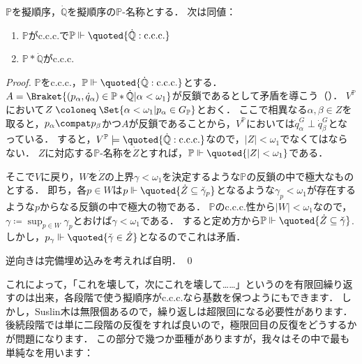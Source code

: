\documentclass[a4j]{ltjsarticle}
\renewcommand{\defeq}{\mathrel{\coloneq}}
\renewcommand{\emph}[1]{\textsf{\textgt{#1}}}
\begin{document}
\begin{lemma}
 $\mathbb{P}$を擬順序，$\dot{\mathbb{Q}}$を擬順序の$\mathbb{P}$-名称とする．
 次は同値：
 \begin{enumerate}
  \item $\mathbb{P}$がc.c.c.で$\mathbb{P} \Vdash \quoted{\dot{\mathbb{Q}}: \text{c.c.c.}}$
  \item $\mathbb{P} \ast \dot{\mathbb{Q}}$がc.c.c.
 \end{enumerate}
\end{lemma}
\begin{proof}
 $\mathbb{P}$をc.c.c.，$\mathbb{P} \Vdash \quoted{\dot{\mathbb{Q}}: \text{c.c.c.}}$とする．$A = \Braket{ (p_\alpha , \dot{q}_\alpha) \in \mathbb{P} \ast \dot{\mathbb{Q}} | \alpha < \omega_1}$が反鎖であるとして矛盾を導こう（\emph{背理法}）．
 $V^{\mathbb{P}}$において$Z \defeq \Set{\alpha < \omega_1 | p_\alpha \in G_{\mathbb{P}}}$とおく．
 ここで相異なる$\alpha, \beta \in Z$を取ると，$p_\alpha \compat p_\beta$かつ$A$が反鎖であることから，$V^{\mathbb{P}}$においては$\dot{q}_\alpha^G \perp \dot{q}_\beta^G$となっている．
 すると，$V^{\mathbb{P}} \models \quoted{\dot{\mathbb{Q}}: \text{c.c.c.}}$なので，$|Z| < \omega_1$でなくてはならない．
 $Z$に対応する$\mathbb{P}$-名称を$\dot{Z}$とすれば，$\mathbb{P} \Vdash \quoted{|Z| < \omega_1}$である．

 そこで$V$に戻り，$W$を$\dot{Z}$の上界$\gamma < \omega_1$を決定するような$\mathbb{P}$の反鎖の中で極大なものとする．
 即ち，各$p \in W$は$p \Vdash \quoted{\dot{Z} \subseteq \check{\gamma}_p}$となるような$\gamma_p < \omega_1$が存在するような$p$からなる反鎖の中で極大の物である．
 $\mathbb{P}$のc.c.c.性から$|W| < \omega_1$なので，$\gamma \defeq \sup_{p \in W} \gamma_p$とおけば$\gamma < \omega_1$である．
 すると定め方から$\mathbb{P} \Vdash \quoted{\dot{Z} \subseteq \check{\gamma}}$.
 しかし，$p_\gamma \Vdash \quoted{\check{\gamma} \in \dot{Z}}$となるのでこれは矛盾．

 逆向きは完備埋め込みを考えれば自明． \qed
\end{proof}

これによって，「これを壊して，次にこれを壊して……」というのを有限回繰り返すのは出来，各段階で使う擬順序がc.c.c.なら基数を保つようにもできます．
しかし，Suslin木は無限個あるので，繰り返しは超限回になる必要性があります．
後続段階では単に二段階の反復をすれば良いので，極限回目の反復をどうするかが問題になります．
この部分で幾つか亜種がありますが，我々はその中で最も単純な\emph{有限台反復}を用います：
\end{document}
